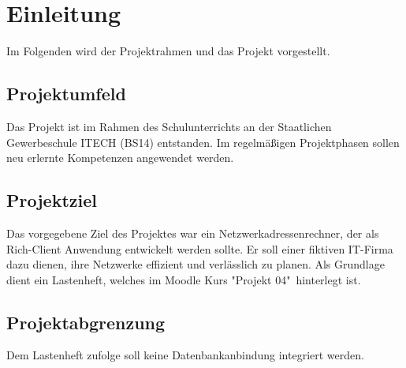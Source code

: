 \section{Einleitung}
Im Folgenden wird der Projektrahmen und das Projekt vorgestellt.

\subsection{Projektumfeld}
Das Projekt ist im Rahmen des Schulunterrichts an der Staatlichen Gewerbeschule ITECH (BS14)
entstanden. Im regelmäßigen Projektphasen sollen neu erlernte Kompetenzen angewendet werden.

\subsection{Projektziel}
Das vorgegebene Ziel des Projektes war ein Netzwerkadressenrechner, der als Rich-Client Anwendung
entwickelt werden sollte. Er soll einer fiktiven IT-Firma dazu dienen, ihre Netzwerke effizient
und verlässlich zu planen.
Als Grundlage dient ein Lastenheft, welches im Moodle Kurs "Projekt 04"\ hinterlegt ist.

\subsection{Projektabgrenzung}
Dem Lastenheft zufolge soll keine Datenbankanbindung integriert werden.